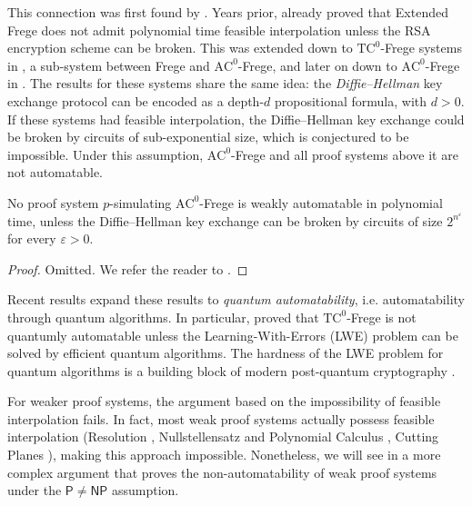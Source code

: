 This connection was first found by \textcite{fis_int_weak_aut}. Years prior, \textcite{kraj_pud_crypto} already proved that Extended Frege does not admit polynomial time feasible interpolation unless the RSA encryption scheme \cite{rsa} can be broken. This was extended down to $\mathrm{TC}^0$-Frege systems in \cite{no_fis_int}, a sub-system between Frege and $\mathrm{AC}^0$-Frege, and later on down to $\mathrm{AC}^0$-Frege in \cite{ac0_crypto}. The results for these systems share the same idea: the \textit{Diffie--Hellman} key exchange protocol \cite{dh} can be encoded as a depth-$d$ propositional formula, with $d > 0$. If these systems had feasible interpolation, the Diffie--Hellman key exchange could be broken by circuits of sub-exponential size, which is conjectured to be impossible. Under this assumption, $\mathrm{AC}^0$-Frege and all proof systems above it are not automatable.

\begin{theorem}
    No proof system $p$-simulating $\mathrm{AC}^0$-Frege is weakly automatable in polynomial time, unless the Diffie--Hellman key exchange can be broken by circuits of size $2^{n^\varepsilon}$ for every $\varepsilon > 0$.
\end{theorem}

\begin{proof}
    Omitted. We refer the reader to \cite{ac0_crypto}.
\end{proof}

Recent results expand these results to \textit{quantum automatability}, i.e. automatability through quantum algorithms. In particular, \textcite{quantum_auto} proved that $\mathrm{TC}^0$-Frege is not quantumly automatable unless the Learning-With-Errors (LWE) problem can be solved by efficient quantum algorithms. The hardness of the LWE problem for quantum algorithms is a building block of modern post-quantum cryptography \cite{lwe}. 

For weaker proof systems, the argument based on the impossibility of feasible interpolation fails. In fact, most weak proof systems actually possess feasible interpolation (Resolution \cite{kraj_fi}, Nullstellensatz and Polynomial Calculus \cite{hak_fi}, Cutting Planes \cite{pud_fi}), making this approach impossible. Nonetheless, we will see in  a more complex argument that proves the non-automatability of weak proof systems under the $\mathsf{P} \neq \mathsf{NP}$ assumption.

